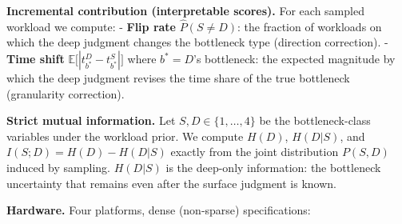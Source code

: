 \textbf{Incremental contribution (interpretable scores).} For each sampled workload we compute: - \textbf{Flip rate} \(\hat{P}(S \neq D)\): the fraction of workloads on which the deep judgment changes the bottleneck type (direction correction). - \textbf{Time shift} \(\mathbb{E}\big[|t^D_{b^*} - t^S_{b^*}|\big]\) where \(b^* = D\)'s bottleneck: the expected magnitude by which the deep judgment revises the time share of the true bottleneck (granularity correction).

\textbf{Strict mutual information.} Let \(S, D \in \{1,\dots,4\}\) be the bottleneck-class variables under the workload prior. We compute \(H(D)\), \(H(D|S)\), and \(I(S;D) = H(D) - H(D|S)\) exactly from the joint distribution \(P(S,D)\) induced by sampling. \(H(D|S)\) is the deep-only information: the bottleneck uncertainty that remains even after the surface judgment is known.

\textbf{Hardware.} Four platforms, dense (non-sparse) specifications:

